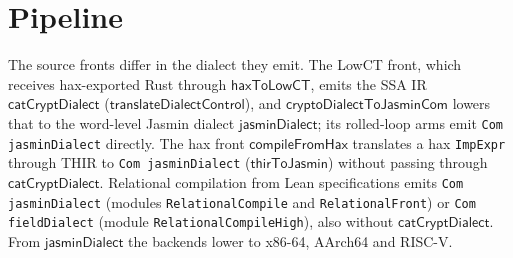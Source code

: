 \section{Pipeline}

The source fronts differ in the dialect they emit. The LowCT front, which receives
hax-exported Rust through $\mathsf{haxToLowCT}$, emits the SSA IR
$\mathsf{catCryptDialect}$ ($\mathsf{translateDialectControl}$), and
$\mathsf{cryptoDialectToJasminCom}$ lowers that to the word-level Jasmin dialect
$\mathsf{jasminDialect}$; its rolled-loop arms emit \texttt{Com jasminDialect}
directly. The hax front $\mathsf{compileFromHax}$ translates a hax
\texttt{ImpExpr} through THIR to \texttt{Com jasminDialect} ($\mathsf{thirToJasmin}$)
without passing through $\mathsf{catCryptDialect}$. Relational compilation from Lean
specifications emits \texttt{Com jasminDialect} (modules
\texttt{RelationalCompile} and \texttt{RelationalFront}) or
\texttt{Com fieldDialect} (module \texttt{RelationalCompileHigh}), also without
$\mathsf{catCryptDialect}$. From $\mathsf{jasminDialect}$ the backends lower to
x86-64, AArch64 and RISC-V.

